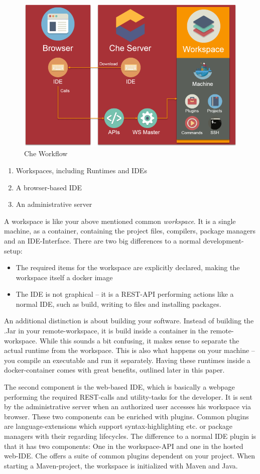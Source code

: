\documentclass[utf8]{lni}
\begin{document}
\begin{figure}[h]
	\centering
	\includegraphics[width=0.7\linewidth]{imgs/Che_Workflow}
	\caption[Che Workflow]{Che Workflow}
	\label{fig:cheworkflow}
\end{figure}
\newpage

\begin{enumerate}
	\item Workspaces, including Runtimes and IDEs
	\item A browser-based IDE
	\item An administrative server
\end{enumerate}
A workspace is like your above mentioned common \textit{workspace}. 
It is a single machine, as a container, containing the project files, compilers, package managers and an IDE-Interface. 
There are two big differences to a normal development-setup:
\begin{itemize}
	\item The required items for the workspace are explicitly  declared, making  the  workspace itself a docker image
	\item The IDE is not graphical – it is a REST-API performing actions like a normal IDE, such as build, writing to files and installing packages.  
\end{itemize}
An additional distinction is about building your software.
Instead of building the .Jar in your remote-workspace, it is build inside a container in the remote-workspace.
While this sounds a bit confusing, it makes sense to separate the actual runtime from the workspace. 
This is also what happens on your machine – you compile an executable and run it separately. 
Having these runtimes inside a docker-container comes with great benefits, outlined later in this paper.

The second component is the web-based IDE, which is basically a webpage performing the required REST-calls and utility-tasks for the developer. 
It is sent by the administrative server when an authorized user accesses his workspace via browser. 
These two components can be enriched with plugins.  
Common plugins are language-extensions which support syntax-highlighting etc. or package managers with their regarding lifecycles.
The difference to a normal IDE plugin is that it has two components: 
One in the workspace-API and one in the hosted web-IDE.  
Che offers a suite of common plugins dependent on your project. 
When starting a Maven-project, the workspace is initialized with Maven and Java.
\end{document}
